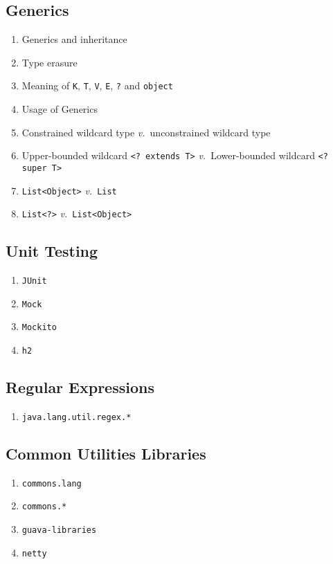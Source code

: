 \documentclass[11pt, twocolumn]{article}
\newcommand{\versus}{\textit{v.}\ }
\begin{document}
\subsection{Generics}
\begin{enumerate}
	\item Generics and inheritance
	\item Type erasure
	\item Meaning of \texttt{K}, \texttt{T}, \texttt{V}, \texttt{E}, \texttt{?} and \texttt{object}
	\item Usage of Generics
	\item Constrained wildcard type \versus unconstrained wildcard type
	\item Upper-bounded wildcard \texttt{<? extends T>} \versus Lower-bounded wildcard \texttt{<? super T>}
	\item \texttt{List<Object>} \versus \texttt{List}
	\item \texttt{List<?>} \versus \texttt{List<Object>}
\end{enumerate}

\subsection{Unit Testing}
\begin{enumerate}
	\item \texttt{JUnit}
	\item \texttt{Mock}
	\item \texttt{Mockito}
	\item \texttt{h2}
\end{enumerate}

\subsection{Regular Expressions}
\begin{enumerate}
	\item \texttt{java.lang.util.regex.*}
\end{enumerate}

\subsection{Common Utilities Libraries}
\begin{enumerate}
	\item \texttt{commons.lang}
	\item \texttt{commons.*}
	\item \texttt{guava-libraries}
	\item \texttt{netty}
\end{enumerate}
\end{document}
